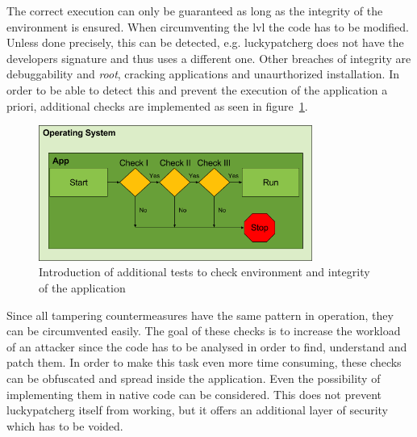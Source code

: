 The correct execution can only be guaranteed as long as the integrity of the environment is ensured.
When circumventing the \gls{lvl} the code has to be modified.
Unless done precisely, this can be detected, e.g. \gls{luckypatcherg} does not have the developers signature and thus uses a different one.
Other breaches of integrity are debuggability and \textit{root}, cracking applications and unaurthorized installation.
In order to be able to detect this and prevent the execution of the application a priori, additional checks are implemented as seen in figure~\ref{fig:verificationNowAdditional}.
\begin{figure}[h]
    \centering
    \includegraphics[width=0.8\textwidth]{data/verificationNowAdditional.png}
    \caption{Introduction of additional tests to check environment and integrity of the application}
    \label{fig:verificationNowAdditional}
\end{figure}
Since all tampering countermeasures have the same pattern in operation, they can be circumvented easily.
The goal of these checks is to increase the workload of an attacker since the code has to be analysed in order to find, understand and patch them.
In order to make this task even more time consuming, these checks can be obfuscated and spread inside the application.
Even the possibility of implementing them in native code can be considered.
\newline
This does not prevent \gls{luckypatcherg} itself from working, but it offers an additional layer of security which has to be voided.
